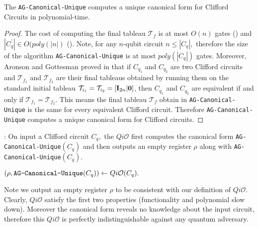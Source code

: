 \begin{lemma}
The {\tt AG-Canonical-Unique} computes a unique canonical form for Clifford Circuits in polynomial-time.
\end{lemma}

\begin{proof}
The cost of computing the final tableau $\mathcal{T}_f$ is at most $O(n)$ gates (\cite{AG04}) and $|C_q^\prime |\in O(poly(|n|)$ (\cite{AG04}).  Note, for any $n$-qubit circuit $n\leq |C_q|,$ therefore the size of the algorithm {\tt AG-Canonical-Unique} is at most $poly(|C_q|)$ gates. Moreover, Aronson and Gottesman proved in \cite{AG04} that if $C_{q_1}$ and $C_{q_2}$ are two Clifford circuits and $\mathcal{T}_{f_1}$ and $\mathcal{T}_{f_2}$ are their final tableaus obtained by running them on the standard initial tableau 
$\mathcal{T}_{i_1}=\mathcal{T}_{i_2}=[{\bf I}_{2n}|{\bf 0}]$, then $C_{q_1}$ and $C_{q_2}$ are equivalent if and only if $\mathcal{T}_{f_1}=\mathcal{T}_{f_2}.$ This means the final tableau $\mathcal{T}_f$ obtain in {\tt AG-Canonical-Unique} is the same for every equivalent Clifford circuit. Therefore {\tt AG-Canonical-Unique} computes a unique canonical form for Clifford circuits.
\end{proof}

:  On input a Clifford circuit $C_q,$ the $Qi\mathcal{O}$ first computes the canonical form  {\tt AG-Canonical-Unique}$(C_q)$ and then outputs an empty register $\rho$ along with {\tt AG-Canonical-Unique}$(C_q).$

\begin{center}
$(\rho, \mbox{{\tt AG-Canonical-Unique}}(C_q))\leftarrow Qi\mathcal{O}(C_q).$
\end{center}
Note we output an empty register $\rho$ to be consistent with our definition of  $Qi\mathcal{O}.$ Clearly, $Qi\mathcal{O}$ satisfy the first two properties (functionality and polynomial slow down). Moreover the canonical form reveals no knowledge about the input circuit, therefore this $Qi\mathcal{O}$ is perfectly indistinguishable against any quantum adversary.







